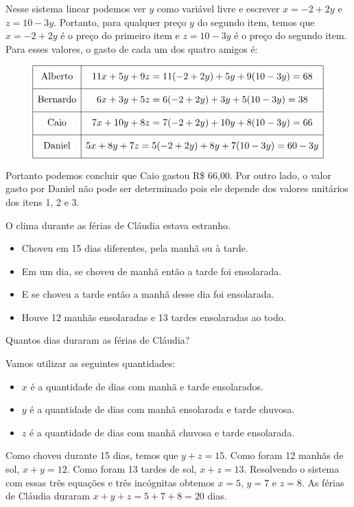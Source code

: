 \begin{solution}
Nesse sistema linear podemos ver $y$ como variável livre e escrever $x=-2+2y$ e $z=10-3y$.
Portanto, para qualquer preço $y$ do segundo item, temos que $x=-2+2y$ é o preço do primeiro item e $z=10-3y$ é o preço do segundo item. Para esses valores, o gasto de cada um dos quatro amigos é:

$$\begin{array}{|c|c|} \hline
\text{Alberto}    &    11x+5y+9z=11(-2+2y)+5y+9(10-3y)=68    \rule{0pt}{14pt}   \\[6pt] \hline
\text{Bernardo}   &    6x+3y+5z=6(-2+2y)+3y+5(10-3y)=38      \rule{0pt}{14pt}   \\[6pt] \hline
\text{Caio}       &    7x+10y+8z=7(-2+2y)+10y+8(10-3y)=66    \rule{0pt}{14pt}   \\[6pt] \hline
\text{Daniel}     &    5x+8y+7z=5(-2+2y)+8y+7(10-3y)=60-3y   \rule{0pt}{14pt}   \\[6pt] \hline
\end{array}$$

\medskip
Portanto podemos concluir que Caio gastou R\$ 66,00.
Por outro lado, o valor gasto por Daniel não pode ser determinado pois ele depende dos valores unitários dos itens 1, 2 e 3.
\end{solution}

\begin{problem}
O clima durante as férias de Cláudia estava estranho.
\begin{itemize}
\item Choveu em 15 dias diferentes, pela manhã ou à tarde.
\item Em um dia, se choveu de manhã então a tarde foi ensolarada.
\item E se choveu a tarde então a manhã desse dia foi ensolarada.
\item Houve 12 manhãs ensolaradas e 13 tardes ensolaradas ao todo.
\end{itemize}
Quantos dias duraram as férias de Cláudia?
\end{problem}
\begin{solution}
Vamos utilizar as seguintes quantidades:
\begin{itemize}
\item $x$ é a quantidade de dias com manhã e tarde ensolarados.
\item $y$ é a quantidade de dias com manhã ensolarada e tarde chuvosa.
\item $z$ é a quantidade de dias com manhã chuvosa e tarde ensolarada.
\end{itemize}
Como choveu durante 15 dias, temos que $y+z=15$. Como foram 12 manhãs de sol, $x+y=12$. Como foram 13 tardes de sol, $x+z=13$. Resolvendo o sistema com essas três equações e três incógnitas obtemos $x=5$, $y=7$ e $z=8$. As férias de Cláudia duraram $x+y+z=5+7+8=20$ dias.
\end{solution}

